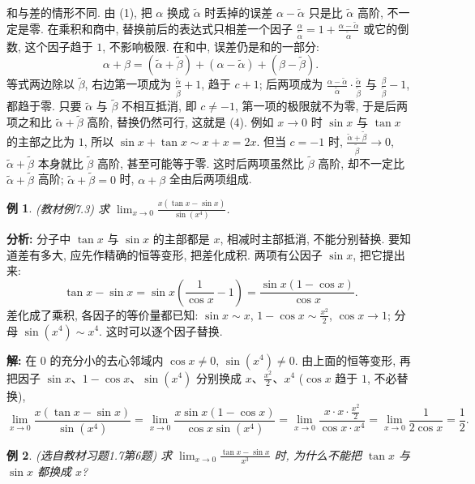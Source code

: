 \documentclass[UTF8,openany]{ctexbook}
\theoremstyle{chinesetextbook}
\newtheorem{example}{例}[section]
\newenvironment{cnsolution}{\par\indent\textbf{解:} \ignorespaces}{\par}
\begin{document}
和与差的情形不同. 由 (1), 把 $\alpha$ 换成 $\widetilde\alpha$ 时丢掉的误差 $\alpha-\widetilde\alpha$ 只是比 $\widetilde\alpha$ 高阶, 不一定是零. 在乘积和商中, 替换前后的表达式只相差一个因子 $\displaystyle\frac\alpha{\widetilde\alpha}=1+\frac{\alpha-\widetilde\alpha}{\widetilde\alpha}$ 或它的倒数, 这个因子趋于 $1$, 不影响极限. 在和中, 误差仍是和的一部分:
\[
\alpha+\beta=(\widetilde\alpha+\widetilde\beta)+(\alpha-\widetilde\alpha)+(\beta-\widetilde\beta).
\]
等式两边除以 $\widetilde\beta$, 右边第一项成为 $\displaystyle\frac{\widetilde\alpha}{\widetilde\beta}+1$, 趋于 $c+1$; 后两项成为 $\displaystyle\frac{\alpha-\widetilde\alpha}{\widetilde\alpha}\cdot\frac{\widetilde\alpha}{\widetilde\beta}$ 与 $\displaystyle\frac\beta{\widetilde\beta}-1$, 都趋于零. 只要 $\widetilde\alpha$ 与 $\widetilde\beta$ 不相互抵消, 即 $c\ne-1$, 第一项的极限就不为零, 于是后两项之和比 $\widetilde\alpha+\widetilde\beta$ 高阶, 替换仍然可行, 这就是 (4). 例如 $x\to0$ 时 $\sin x$ 与 $\tan x$ 的主部之比为 $1$, 所以 $\sin x+\tan x\sim x+x=2x$. 但当 $c=-1$ 时, $\displaystyle\frac{\widetilde\alpha+\widetilde\beta}{\widetilde\beta}\to0$, $\widetilde\alpha+\widetilde\beta$ 本身就比 $\widetilde\beta$ 高阶, 甚至可能等于零. 这时后两项虽然比 $\widetilde\beta$ 高阶, 却不一定比 $\widetilde\alpha+\widetilde\beta$ 高阶; $\widetilde\alpha+\widetilde\beta=0$ 时, $\alpha+\beta$ 全由后两项组成.
\begin{example}\label{ex:7-3}
\textnormal{(教材例7.3)} 求 $\displaystyle\lim_{x\to0}\frac{x(\tan x-\sin x)}{\sin(x^4)}$.
\end{example}
\par\indent\textbf{分析:} 分子中 $\tan x$ 与 $\sin x$ 的主部都是 $x$, 相减时主部抵消, 不能分别替换. 要知道差有多大, 应先作精确的恒等变形, 把差化成积. 两项有公因子 $\sin x$, 把它提出来:
\[
\tan x-\sin x=\sin x\left(\frac1{\cos x}-1\right)=\frac{\sin x(1-\cos x)}{\cos x}.
\]
差化成了乘积, 各因子的等价量都已知: $\sin x\sim x$, $\displaystyle1-\cos x\sim\frac{x^2}2$, $\cos x\to1$; 分母 $\sin(x^4)\sim x^4$. 这时可以逐个因子替换.
\begin{cnsolution}
在 $0$ 的充分小的去心邻域内 $\cos x\ne0$, $\sin(x^4)\ne0$. 由上面的恒等变形, 再把因子 $\sin x$、$1-\cos x$、$\sin(x^4)$ 分别换成 $x$、$\displaystyle\frac{x^2}2$、$x^4$ ($\cos x$ 趋于 $1$, 不必替换),
\[
\lim_{x\to0}\frac{x(\tan x-\sin x)}{\sin(x^4)}=\lim_{x\to0}\frac{x\sin x(1-\cos x)}{\cos x\sin(x^4)}=\lim_{x\to0}\frac{x\cdot x\cdot\frac{x^2}2}{\cos x\cdot x^4}=\lim_{x\to0}\frac1{2\cos x}=\frac12.
\]
\end{cnsolution}
\begin{example}
\textnormal{(选自教材习题1.7第6题)} 求 $\displaystyle\lim_{x\to0}\frac{\tan x-\sin x}{x^3}$ 时, 为什么不能把 $\tan x$ 与 $\sin x$ 都换成 $x$?
\end{example}
\end{document}
